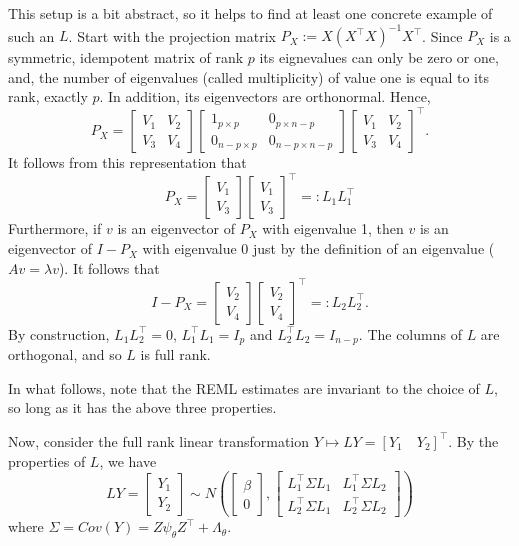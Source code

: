 \documentclass[
]{book}
\begin{document}
This setup is a bit abstract, so it helps to find at least one concrete example of such an \(L\). Start with the projection matrix \(P_X := X(X^\top X)^{-1}X^\top\). Since \(P_X\) is a symmetric, idempotent matrix of rank \(p\) its eignevalues can only be zero or one, and, the number of eigenvalues (called multiplicity) of value one is equal to its rank, exactly \(p\). In addition, its eigenvectors are orthonormal. Hence,
\[P_X = \begin{bmatrix}V_1 & V_2\\
V_3 &V_4\end{bmatrix}\begin{bmatrix}1_{p\times p} & 0_{p\times n-p}\\
0_{n-p \times p} & 0_{n-p \times n-p}\end{bmatrix}\begin{bmatrix}V_1 & V_2\\
V_3 &V_4\end{bmatrix}^\top.\]
It follows from this representation that
\[P_X = \begin{bmatrix}V_1 \\
V_3\end{bmatrix}\begin{bmatrix}V_1 \\
V_3 \end{bmatrix}^\top=:L_1L_1^\top\]
Furthermore, if \(v\) is an eigenvector of \(P_X\) with eigenvalue 1, then \(v\) is an eigenvector of \(I-P_X\) with eigenvalue 0 just by the definition of an eigenvalue (\(Av=\lambda v\)). It follows that
\[I-P_X = \begin{bmatrix}V_2 \\
V_4\end{bmatrix}\begin{bmatrix}V_2 \\
V_4 \end{bmatrix}^\top=:L_2 L_2^\top.\]
By construction, \(L_1L_2^\top = 0\), \(L_1^\top L_1 = I_p\) and \(L_2^\top L_2 = I_{n-p}\). The columns of \(L\) are orthogonal, and so \(L\) is full rank.

In what follows, note that the REML estimates are invariant to the choice of \(L\), so long as it has the above three properties.

Now, consider the full rank linear transformation \(Y \mapsto LY = [Y_1 \quad Y_2]^\top\). By the properties of \(L\), we have
\[LY = \begin{bmatrix} Y_1\\Y_2 \end{bmatrix} \sim N\left(\begin{bmatrix} \beta \\ 0\end{bmatrix}, \begin{bmatrix} L_1^\top \Sigma L_1 &L_1^\top \Sigma L_2\\ L_2^\top \Sigma L_1 & L_2^\top \Sigma L_2 \end{bmatrix}\right)\]
where \(\Sigma = Cov(Y) = Z \psi_\theta Z^\top + \Lambda_\theta\).
\end{document}
